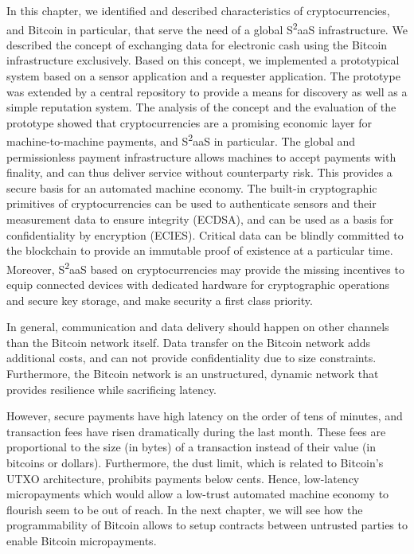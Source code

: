 In this chapter, we identified and described characteristics of cryptocurrencies, and Bitcoin in particular, that serve the need of a global S\textsuperscript{2}aaS infrastructure. We described the concept of exchanging data for electronic cash using the Bitcoin infrastructure exclusively. Based on this concept, we implemented a prototypical system based on a sensor application and a requester application. The prototype was extended by a central repository to provide a means for discovery as well as a simple reputation system. The analysis of the concept and the evaluation of the prototype showed that cryptocurrencies are a promising economic layer for machine-to-machine payments, and S\textsuperscript{2}aaS in particular. The global and permissionless payment infrastructure allows machines to accept payments with finality, and can thus deliver service without counterparty risk. This provides a secure basis for an automated machine economy. The built-in cryptographic primitives of cryptocurrencies can be used to authenticate sensors and their measurement data to ensure integrity (\ac{ECDSA}), and can be used as a basis for confidentiality by encryption (\ac{ECIES}). Critical data can be blindly committed to the blockchain to provide an immutable proof of existence at a particular time. Moreover, S\textsuperscript{2}aaS based on cryptocurrencies may provide the missing incentives to equip connected devices with dedicated hardware for cryptographic operations and secure key storage, and make security a first class priority. 

In general, communication and data delivery should happen on other channels than the Bitcoin network itself. Data transfer on the Bitcoin network adds additional costs, and can not provide confidentiality due to size constraints. Furthermore, the Bitcoin network is an unstructured, dynamic network that provides resilience while sacrificing latency.

However, secure payments have high latency on the order of tens of minutes, and transaction fees have risen dramatically during the last month. These fees are proportional to the size (in bytes) of a transaction instead of their value (in bitcoins or dollars). Furthermore, the dust limit, which is related to Bitcoin's \ac{UTXO} architecture, prohibits payments below cents. Hence, low-latency micropayments which would allow a low-trust automated machine economy to flourish seem to be out of reach. In the next chapter, we will see how the programmability of Bitcoin allows to setup contracts between untrusted parties to enable Bitcoin micropayments. 


